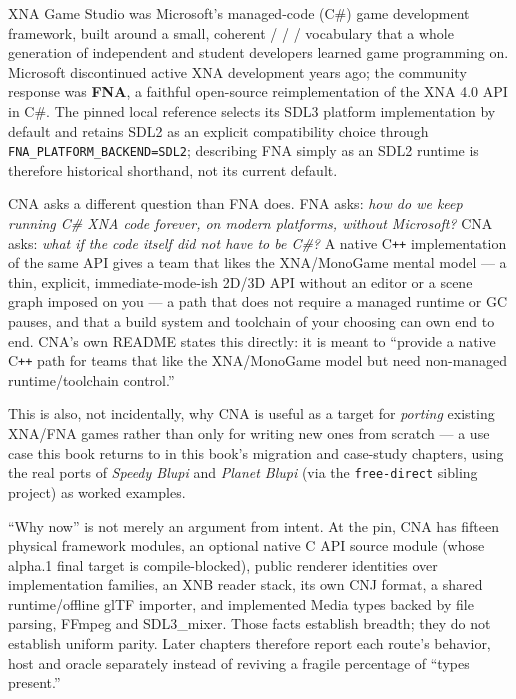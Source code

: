XNA Game Studio was Microsoft's managed-code (C\#) game development framework, built around
a small, coherent  /  /  / 
vocabulary that a whole generation of independent and student developers learned game
programming on. Microsoft discontinued active XNA development years ago; the community
response was \textbf{FNA}, a faithful open-source reimplementation of the XNA 4.0 API in
C\#. The pinned local reference selects its SDL3 platform implementation by default and retains SDL2 as
an explicit compatibility choice through \texttt{FNA\_PLATFORM\_BACKEND=SDL2}; describing FNA
simply as an SDL2 runtime is therefore historical shorthand, not its current default.

CNA asks a different question than FNA does. FNA asks: \emph{how do we keep running C\#
XNA code forever, on modern platforms, without Microsoft?} CNA asks: \emph{what if the code
itself did not have to be C\#?} A native C\texttt{++} implementation of the same API gives a
team that likes the XNA/MonoGame mental model --- a thin, explicit, immediate-mode-ish 2D/3D
API without an editor or a scene graph imposed on you --- a path that does not require a
managed runtime or GC pauses, and that a build system and toolchain of your choosing can
own end to end. CNA's own README states this directly: it is meant to ``provide a native
C\texttt{++} path for teams that like the XNA/MonoGame model but need non-managed
runtime/toolchain control.''

This is also, not incidentally, why CNA is useful as a target for \emph{porting} existing
XNA/FNA games rather than only for writing new ones from scratch --- a use case this book
returns to in this book's migration and case-study chapters, using the real ports of
\emph{Speedy Blupi} and \emph{Planet Blupi} (via the \texttt{free-direct} sibling project)
as worked examples.

``Why now'' is not merely an argument from intent. At the pin, CNA has fifteen physical
framework modules, an optional native C API source module (whose alpha.1 final target is
compile-blocked), \RendererIdentityCount{} public renderer identities over
\RendererFamilyCount{} implementation families, an XNB
reader stack, its own CNJ format, a shared runtime/offline glTF importer, and implemented Media
types backed by file parsing, FFmpeg and SDL3\_mixer.  Those facts establish breadth; they do not
establish uniform parity.  Later chapters therefore report each route's behavior, host and
oracle separately instead of reviving a fragile percentage of ``types present.''

